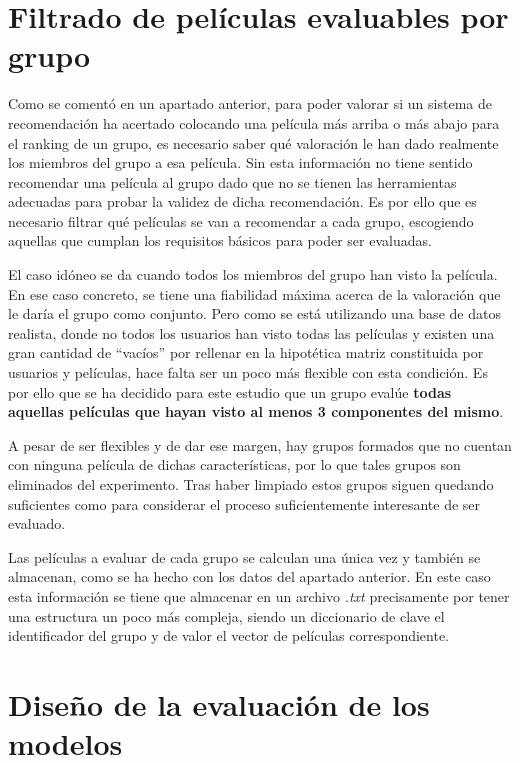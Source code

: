 \section{Filtrado de películas evaluables por grupo}

Como se comentó en un apartado anterior, para poder valorar si un sistema de recomendación ha acertado colocando una película más arriba o más abajo para el ranking de un grupo, es necesario saber qué valoración le han dado realmente los miembros del grupo a esa película. Sin esta información no tiene sentido recomendar una película al grupo dado que no se tienen las herramientas adecuadas para probar la validez de dicha recomendación. Es por ello que es necesario filtrar qué películas se van a recomendar a cada grupo, escogiendo aquellas que cumplan los requisitos básicos para poder ser evaluadas.

El caso idóneo se da cuando todos los miembros del grupo han visto la película. En ese caso concreto, se tiene una fiabilidad máxima acerca de la valoración que le daría el grupo como conjunto. Pero como se está utilizando una base de datos realista, donde no todos los usuarios han visto todas las películas y existen una gran cantidad de ``vacíos'' por rellenar en la hipotética matriz constituida por usuarios y películas, hace falta ser un poco más flexible con esta condición. Es por ello que se ha decidido para este estudio que un grupo evalúe \textbf{todas aquellas películas que hayan visto al menos 3 componentes del mismo}.

A pesar de ser flexibles y de dar ese margen, hay grupos formados que no cuentan con ninguna película de dichas características, por lo que tales grupos son eliminados del experimento. Tras haber limpiado estos grupos siguen quedando suficientes como para considerar el proceso suficientemente interesante de ser evaluado.

Las películas a evaluar de cada grupo se calculan una única vez y también se almacenan, como se ha hecho con los datos del apartado anterior. En este caso esta información se tiene que almacenar en un archivo \textit{.txt} precisamente por tener una estructura un poco más compleja, siendo un diccionario de clave el identificador del grupo y de valor el vector de películas correspondiente.

\section{Diseño de la evaluación de los modelos}

